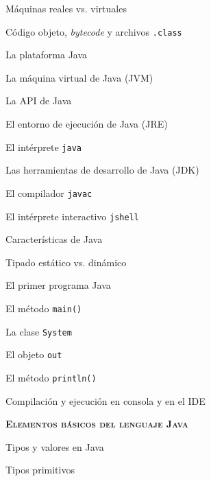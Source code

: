 \begin{longenum}
\begin{longenum}
\begin{longenum}
            \item Máquinas reales vs. virtuales
            \item Código objeto, \textit{bytecode} y archivos \texttt{.class}
            \item La plataforma Java
            \begin{longenum}
                \item La máquina virtual de Java (JVM)
                \item La API de Java
            \end{longenum}
            \item El entorno de ejecución de Java (JRE)
            \begin{longenum}
                \item El intérprete \texttt{java}
            \end{longenum}
            \item Las herramientas de desarrollo de Java (JDK)
            \begin{longenum}
                \item El compilador \texttt{javac}
                \item El intérprete interactivo \texttt{jshell}
            \end{longenum}
        \end{longenum}
        \item Características de Java
        \item Tipado estático vs. dinámico
        \item El primer programa Java
        \begin{longenum}
            \item El método \texttt{main()}
            \item La clase \texttt{System}
            \item El objeto \texttt{out}
            \item El método \texttt{println()}
            \item Compilación y ejecución en consola y en el IDE
        \end{longenum}
    \end{longenum}
    \item \textbf{\textsc{Elementos básicos del lenguaje Java}}
    \begin{longenum}
        \item Tipos y valores en Java
        \begin{longenum}
            \item Tipos  primitivos

\end{longenum}
\end{longenum}
\end{longenum}
